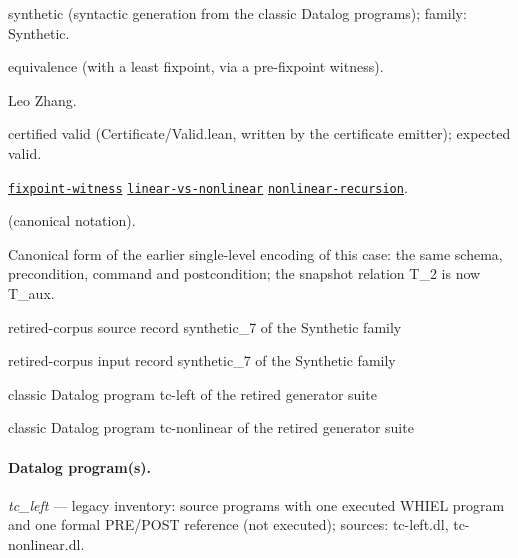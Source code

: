 \documentclass[10pt]{article}
\begin{document}
\begin{description}[leftmargin=2.6cm,style=nextline,itemsep=1pt]

\item[Category] synthetic (syntactic generation from the classic Datalog programs); family: Synthetic.

\item[Kind] equivalence (with a least fixpoint, via a pre-fixpoint witness).

\item[Contributors] Leo Zhang.

\item[Status] certified valid (Certificate/Valid.lean, written by the certificate emitter); expected valid.

\item[Tags] \hyperref[tag:fixpoint-witness]{\texttt{fixpoint-witness}} \hyperref[tag:linear-vs-nonlinear]{\texttt{linear-vs-nonlinear}} \hyperref[tag:nonlinear-recursion]{\texttt{nonlinear-recursion}}.

\item[Input]  (canonical notation).

\item[Summary] Canonical form of the earlier single-level encoding of this case: the same schema, precondition, command and postcondition; the snapshot relation T\_2 is now T\_aux.

\item[Sources] {\raggedright retired-corpus source record synthetic\_7 of the Synthetic family \par retired-corpus input record synthetic\_7 of the Synthetic family \par classic Datalog program tc-left of the retired generator suite \par classic Datalog program tc-nonlinear of the retired generator suite\par}

\end{description}

\paragraph{Datalog program(s).}

{\raggedright\textit{tc\_left} --- legacy inventory: source programs with one executed WHIEL program and one formal PRE/POST reference (not executed); sources: tc-left.dl, tc-nonlinear.dl.\par}
\end{document}
